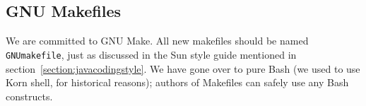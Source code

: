 \subsection{GNU Makefiles} 

We are committed to GNU Make.  All new makefiles should be named {\tt
GNUmakefile}, just as discussed in the Sun style guide mentioned in
section~\ref{section:javacodingstyle}.  We have gone over to pure Bash
(we used to use Korn shell, for historical reasons); authors of
Makefiles can safely use any Bash constructs.

